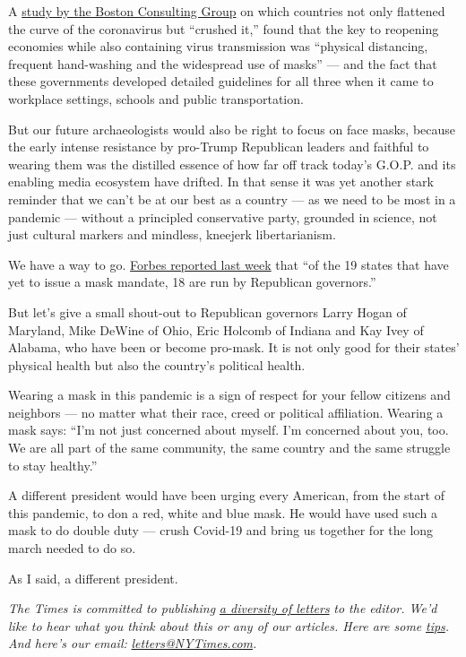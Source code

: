 A
\href{https://www.bcg.com/publications/2020/why-its-not-too-late-to-contain-the-virus}{study
by the Boston Consulting Group} on which countries not only flattened
the curve of the coronavirus but ``crushed it,'' found that the key to
reopening economies while also containing virus transmission was
``physical distancing, frequent hand-washing and the widespread use of
masks'' --- and the fact that these governments developed detailed
guidelines for all three when it came to workplace settings, schools and
public transportation.

But our future archaeologists would also be right to focus on face
masks, because the early intense resistance by pro-Trump Republican
leaders and faithful to wearing them was the distilled essence of how
far off track today's G.O.P. and its enabling media ecosystem have
drifted. In that sense it was yet another stark reminder that we can't
be at our best as a country --- as we need to be most in a pandemic ---
without a principled conservative party, grounded in science, not just
cultural markers and mindless, kneejerk libertarianism.

We have a way to go.
\href{https://www.forbes.com/sites/jackbrewster/2020/07/24/19-states-still-dont-mandate-masks-18-are-run-by-republican-governors/\#37bbd2e16243}{Forbes
reported last week} that ``of the 19 states that have yet to issue a
mask mandate, 18 are run by Republican governors.''

But let's give a small shout-out to Republican governors Larry Hogan of
Maryland, Mike DeWine of Ohio, Eric Holcomb of Indiana and Kay Ivey of
Alabama, who have been or become pro-mask. It is not only good for their
states' physical health but also the country's political health.

Wearing a mask in this pandemic is a sign of respect for your fellow
citizens and neighbors --- no matter what their race, creed or political
affiliation. Wearing a mask says: ``I'm not just concerned about myself.
I'm concerned about you, too. We are all part of the same community, the
same country and the same struggle to stay healthy.''

A different president would have been urging every American, from the
start of this pandemic, to don a red, white and blue mask. He would have
used such a mask to do double duty --- crush Covid-19 and bring us
together for the long march needed to do so.

As I said, a different president.

\emph{The Times is committed to publishing}
\href{https://www.nytimes3xbfgragh.onion/2019/01/31/opinion/letters/letters-to-editor-new-york-times-women.html}{\emph{a
diversity of letters}} \emph{to the editor. We'd like to hear what you
think about this or any of our articles. Here are some}
\href{https://help.nytimes3xbfgragh.onion/hc/en-us/articles/115014925288-How-to-submit-a-letter-to-the-editor}{\emph{tips}}\emph{.
And here's our email:}
\href{mailto:letters@NYTimes.com}{\emph{letters@NYTimes.com}}\emph{.}

